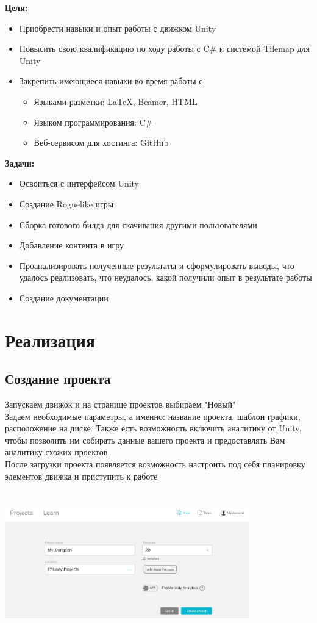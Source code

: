 \documentclass[a4paper,12pt]{article}
\begin{document}
\textbf{Цели:}
\begin{itemize}
    \item Приобрести навыки и опыт работы с движком Unity
    \item Повысить свою квалификацию по ходу работы с C\# и системой Tilemap для Unity
    \item Закрепить имеющиеся навыки во время работы с:
    \begin{itemize}
     \item Языками разметки: LaTeX, Beamer, HTML
    \item Языком программирования: C\#
    \item Веб-сервисом для хостинга: GitHub
    \end{itemize}
\end{itemize}

\textbf{Задачи:} 
\begin{itemize}
    \item Освоиться с интерфейсом Unity
    \item Создание Roguelike игры
    \item Сборка готового билда для скачивания другими пользователями
    \item Добавление контента в игру
    \item Проанализировать полученные результаты и сформулировать выводы, что удалось реализовать, что неудалось, какой получили опыт в результате работы
    \item Создание документации
\end{itemize}

\newpage
\section{Реализация}

\subsection{Создание проекта }

Запускаем движок и на странице проектов выбираем "Новый" \\
Задаем необходимые параметры, а именно: название проекта, шаблон графики, расположение на диске. Также есть возможность включить аналитику от Unity, чтобы позволить им собирать данные вашего проекта и предоставлять Вам аналитику схожих проектов.\\
После загрузки проекта появляется возможность настроить под себя планировку элементов движка и приступить к работе \\
\\
\includegraphics[width = 400px, height=220px]{pictures/project.png}
\end{document}

